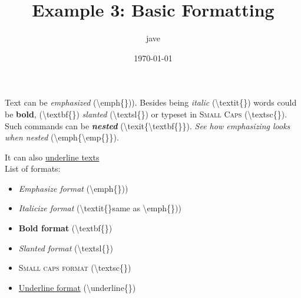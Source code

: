 \documentclass[letterpaper, 12pt]{article}
\begin{document}
\title{Example 3: Basic Formatting}
\author{jave}
\date{\today}
\maketitle


\newcommand{\emphEx}{\textbackslash{}emph\{\})}
\newcommand{\textitEx}{\textbackslash{}textit\{\}}
\newcommand{\textbfEx}{\textbackslash{}textbf\{\}}
\newcommand{\textslEx}{\textbackslash{}textsl\{\}}
\newcommand{\textscEx}{\textbackslash{}textsc\{\}}
\newcommand{\underlineEx}{\textbackslash{}underline\{\}}

Text can be \emph{emphasized} (\emphEx).
Besides being \textit{italic} (\textitEx) words could be \textbf{bold}, (\textbfEx)
\textsl{slanted} (\textslEx) or typeset in \textsc{Small Caps} (\textscEx).
Such commands can be \textit{\textbf{nested}} (\textbackslash{}texit\{\textbackslash{}textbf\{\}\}).
\emph{See how \emph{emphasizing} looks when nested} (\textbackslash{}emph\{\textbackslash{}emp\{\}\}).

It can also \underline{underline texts}\\

List of formats:
\begin{itemize}
    \item \emph{Emphasize format} (\emphEx)
    \item \textit{Italicize format} (\textitEx same as \emphEx)
    \item \textbf{Bold format} (\textbfEx)
    \item \textsl{Slanted format} (\textslEx)
    \item \textsc{Small caps format} (\textscEx)
    \item \underline{Underline format} (\underlineEx)
\end{itemize}
\end{document}
